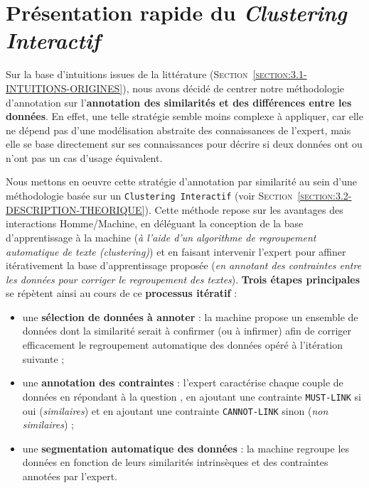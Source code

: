 	
	\newpage
	\section{Présentation rapide du \textit{Clustering Interactif}}
		\label{section:5.1-GUIDE-PRESENTATION-RAPIDE}
		
		Sur la base d'intuitions issues de la littérature (\textsc{Section~\ref{section:3.1-INTUITIONS-ORIGINES}}), nous avons décidé de centrer notre méthodologie d'annotation sur l'\textbf{annotation des similarités et des différences entre les données}.
		En effet, une telle stratégie semble moins complexe à appliquer, car elle ne dépend pas d'une modélisation abstraite des connaissances de l'expert, mais elle se base directement sur ses connaissances pour décrire si deux données ont ou n'ont pas un cas d'usage équivalent.
		
		Nous mettons en oeuvre cette stratégie d'annotation par similarité au sein d'une méthodologie basée sur un \texttt{Clustering Interactif} (voir \textsc{Section~\ref{section:3.2-DESCRIPTION-THEORIQUE}}).
		Cette méthode repose sur les avantages des interactions Homme/Machine, en déléguant la conception de la base d'apprentissage à la machine (\textit{à l'aide d'un algorithme de regroupement automatique de texte (clustering)}) et en faisant intervenir l'expert pour affiner itérativement la base d'apprentissage proposée (\textit{en annotant des contraintes entre les données pour corriger le regroupement des textes}).
		\textbf{Trois étapes principales} se répètent ainsi au cours de ce \textbf{processus itératif} :
		\begin{itemize}
			\item une \textbf{sélection de données à annoter} :
			la machine propose un ensemble de données dont la similarité serait à confirmer (ou à infirmer) afin de corriger efficacement le regroupement automatique des données opéré à l'itération suivante ;
			\item une \textbf{annotation des contraintes} :
			l'expert caractérise chaque couple de données en répondant à la question , en ajoutant une contrainte \texttt{MUST-LINK} si oui (\textit{similaires}) et en ajoutant une contrainte \texttt{CANNOT-LINK} sinon (\textit{non similaires}) ;
			\item une \textbf{segmentation automatique des données} : la machine regroupe les données en fonction de leurs similarités intrinsèques et des contraintes annotées par l'expert.
		\end{itemize}
		
